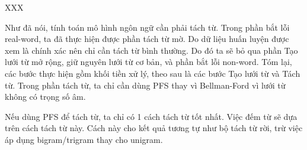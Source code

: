 \documentclass[a4paper,oneside,14pt]{extbook} %
\begin{document}
XXX %




Như đã nói, tính toán mô hình ngôn ngữ cần phải tách từ. Trong phần
bắt lỗi real-word, ta đã thực hiện được phần tách từ mờ. Do dữ liệu
huấn luyện được xem là chính xác nên chỉ cần tách từ bình thường. Do
đó ta sẽ bỏ qua phần Tạo lưới từ mở rộng, giữ nguyên lưới từ cơ
bản, và phần bắt lỗi non-word. Tóm lại, các bước thực hiện gồm khối
tiền xử lý, theo sau là các bước Tạo lưới từ và Tách từ. Trong phần
tách từ, ta chỉ cần dùng PFS thay vì Bellman-Ford vì lưới từ không có
trọng số âm.


Nếu dùng PFS để tách từ, ta chỉ có 1 cách tách từ tốt nhất. Việc đếm
từ sẽ dựa trên cách tách từ này. Cách này cho kết quả tương tự như bộ
tách từ rời, trừ việc áp dụng bigram/trigram thay cho unigram.
\end{document}
